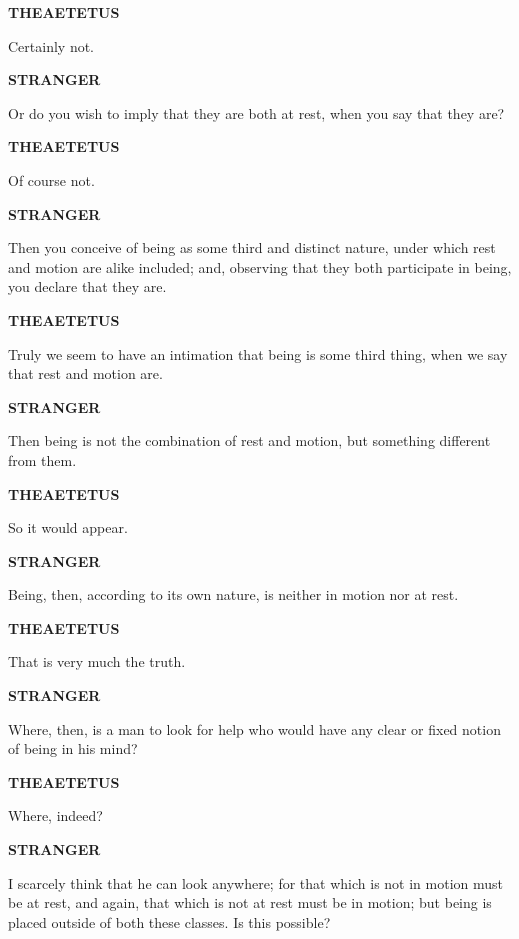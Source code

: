 \documentclass[11pt,letter]{article}
\begin{document}
\par \textbf{THEAETETUS}
\par   Certainly not.

\par \textbf{STRANGER}
\par   Or do you wish to imply that they are both at rest, when you say that they are?

\par \textbf{THEAETETUS}
\par   Of course not.

\par \textbf{STRANGER}
\par   Then you conceive of being as some third and distinct nature, under which rest and motion are alike included; and, observing that they both participate in being, you declare that they are.

\par \textbf{THEAETETUS}
\par   Truly we seem to have an intimation that being is some third thing, when we say that rest and motion are.

\par \textbf{STRANGER}
\par   Then being is not the combination of rest and motion, but something different from them.

\par \textbf{THEAETETUS}
\par   So it would appear.

\par \textbf{STRANGER}
\par   Being, then, according to its own nature, is neither in motion nor at rest.

\par \textbf{THEAETETUS}
\par   That is very much the truth.

\par \textbf{STRANGER}
\par   Where, then, is a man to look for help who would have any clear or fixed notion of being in his mind?

\par \textbf{THEAETETUS}
\par   Where, indeed?

\par \textbf{STRANGER}
\par   I scarcely think that he can look anywhere; for that which is not in motion must be at rest, and again, that which is not at rest must be in motion; but being is placed outside of both these classes. Is this possible?
\end{document}

